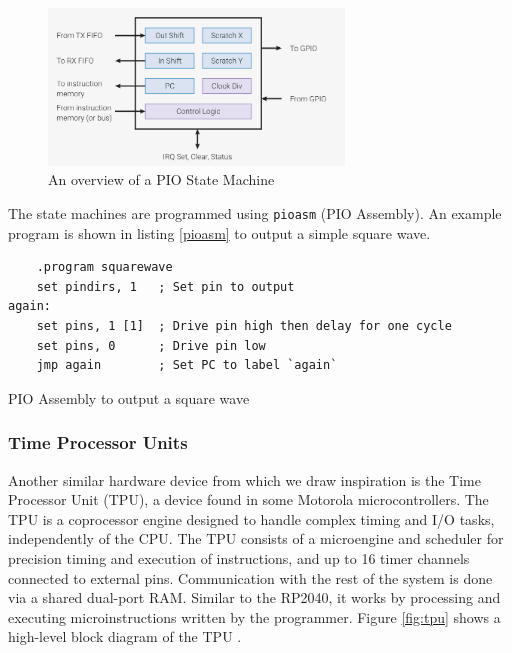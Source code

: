 \documentclass[a4paper,fleqn,12pt]{article}
\begin{document}
\begin{figure}[H]
	\centering
	\includegraphics[width=0.7\textwidth]{../img/rp2040-state-machine.png}
	\caption{An overview of a PIO State Machine \citep{rp2040}}
	\label{fig:pio-sm}
\end{figure}

The state machines are programmed using \texttt{pioasm} (PIO Assembly). An example program is shown in listing \ref{pioasm} to output a simple square wave.

\begin{listing}[b]
	\vspace{0.5cm}
	\begin{verbatim}
    .program squarewave
    set pindirs, 1   ; Set pin to output
again:
    set pins, 1 [1]  ; Drive pin high then delay for one cycle
    set pins, 0      ; Drive pin low
    jmp again        ; Set PC to label `again`
    \end{verbatim}
	\caption{PIO Assembly to output a square wave \citep{rp2040}}
	\label{pioasm}
\end{listing}

\subsubsection{Time Processor Units}

Another similar hardware device from which we draw inspiration is the Time Processor Unit (TPU), a device found in some Motorola microcontrollers. The TPU is a coprocessor engine designed to handle complex timing and I/O tasks, independently of the CPU. The TPU consists of a microengine and scheduler for precision timing and execution of instructions, and up to 16 timer channels connected to external pins. Communication with the rest of the system is done via a shared dual-port RAM. Similar to the RP2040, it works by processing and executing microinstructions written by the programmer. Figure \ref{fig:tpu} shows a high-level block diagram of the TPU \citep{tpu}.
\end{document}
